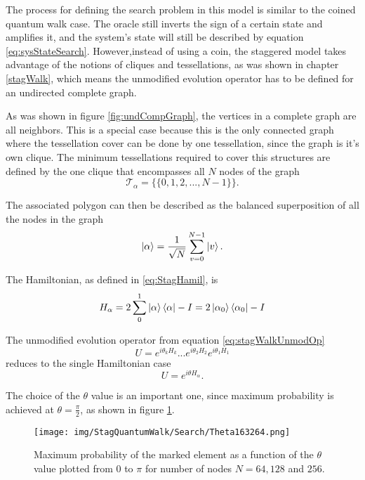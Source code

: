 \documentclass[../../dissertation.tex]{subfiles}
\begin{document}
The process for defining the search problem in this model is similar to the coined quantum walk case. The oracle still inverts the sign of a certain state and amplifies it, and the system's state will still be described by equation \ref{eq:sysStateSearch}. However,instead of using a coin, the staggered model takes advantage of the notions of cliques and tessellations, as was shown in chapter \ref{stagWalk}, which means the unmodified evolution operator has to be defined for an undirected complete graph.\par
As was shown in figure \ref{fig:undCompGraph}, the vertices in a complete graph are all neighbors. This is a special case because this is the only connected graph where the tessellation cover can be done by one tessellation, since the graph is it's own clique. The minimum tessellations required to cover this structures are defined by the one clique that encompasses all $N$ nodes of the graph
\begin{equation}
	\mathscr{T}_{\alpha} = \{\{0,1,2,...,N-1\}\}.
\end{equation}\par
The associated polygon can then be described as the balanced superposition of all the nodes in the graph
\begin{equation}
	\ket{\alpha} = \frac{1}{\sqrt{N}} \sum_{v=0}^{N-1} \ket{v}.
\end{equation}\par
The Hamiltonian, as defined in \ref{eq:StagHamil}, is 
\begin{equation}
	H_\alpha = 2\sum_0^1\ket{\alpha}\bra{\alpha} - I = 2\ket{\alpha_0}\bra{\alpha_0} - I
\end{equation}\par
The unmodified evolution operator from equation \ref{eq:stagWalkUnmodOp}
\begin{equation}
	U = e^{i\theta_{k}H_{k}}...e^{i\theta_{2}H_{2}}e^{i\theta_{1}H_{1}}
\end{equation}
reduces to the single Hamiltonian case
\begin{equation}
	U = e^{i\theta H_\alpha}.
	\label{eq:stagQWSearchUnmodEvo1}
\end{equation}\par
The choice of the $\theta$ value is an important one, since maximum probability is achieved at $\theta = \frac{\pi}{2}$, as shown in figure \ref{fig:stagMultTheta}.
\begin{figure}[!h]
	\centering
	\texttt{[image: img/StagQuantumWalk/Search/Theta163264.png]}
	\caption{Maximum probability of the marked element as a function of the $\theta$ value plotted from $0$ to $\pi$ for number of nodes $N=64,128$ and $256$.} 
	\label{fig:stagMultTheta}
\end{figure}
\end{document}
